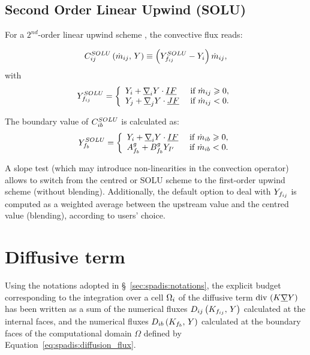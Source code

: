 \subsection{Second Order Linear Upwind (SOLU)}
For a $2^{nd}$-order linear upwind scheme%
, the convective flux reads:

\begin{equation}
C_{ij}^{SOLU} \left( \dot{m}_{ij} , \, Y \right)  \equiv \left(Y_{f_{ij}}^{SOLU} - Y_i \right) \dot{m}_{ij} ,
\end{equation}
with
\begin{equation}
Y_{f_{ij}}^{SOLU} =
\left\lbrace\begin{array}{l l}
Y_i +\underline{\nabla}_i Y \cdot \underline{IF}  & \text{ if } \dot{m}_{ij}  \geqslant 0,\\
Y_j +\underline{\nabla}_j Y \cdot\underline{JF}   & \text{ if } \dot{m}_{ij} < 0 .
\end{array}\right.
\end{equation}


The boundary value of $C_{ib}^{SOLU}$ is calculated as:
\begin{equation}
Y_{f_{b}}^{SOLU} =
\left\lbrace\begin{array}{l l}
Y_i +\underline{\nabla}_i Y \cdot \underline{IF}  & \text{ if } \dot{m}_{ib}  \geqslant 0,\\
A^g_{f_{b}}  + B^g_{f_{b}} Y_{I^\prime}  & \text{ if } \dot{m}_{ib} < 0.
\end{array}\right.
\end{equation}

\begin{remark}
A slope test (which may introduce non-linearities in the convection operator) allows to switch from
the centred or SOLU scheme to the first-order upwind scheme (without blending). Additionally, the default option to deal with $Y_{f_{ij}}$ is
computed as a weighted average between the upstream value and the centred value (blending), according to users' choice.
\end{remark}


\section{Diffusive term}\label{sec:spadis:diffusion}
Using the notations adopted in \S~\ref{sec:spadis:notations},
the explicit budget corresponding to the integration over a cell
$\Omega_{i}$ of the diffusive term $\text{div}\, \left( K \underline{\nabla} Y \right) $
has been written as a sum of the
numerical fluxes $D_{ij} \left( K_{f_{ij}} , \, Y \right)$ calculated at the internal faces,
 and the numerical fluxes $D_{ib} \left( K_{f_{b}} , \, Y \right)$ calculated at the
boundary faces of the computational domain $\Omega$ defined by Equation~\eqref{eq:spadis:diffusion_flux}.

